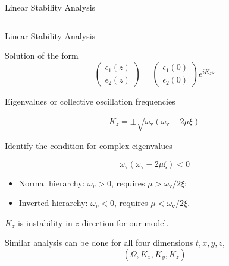 \documentclass[9pt]{beamer}
\begin{document}
\begin{darkframes}
\begin{frame}{Linear Stability Analysis}
\begin{columns}[T]
\begin{column}{0.45\textwidth}
\end{column}


\end{columns}



\end{frame}


\begin{frame}{Linear Stability Analysis}


Solution of the form
\begin{equation*}
   \begin{pmatrix}
      \epsilon_1(z)\\
      \epsilon_2(z)
   \end{pmatrix} = \begin{pmatrix}
      \epsilon_1(0)\\
      \epsilon_2(0)
   \end{pmatrix} e^{i K_z z}
\end{equation*}


Eigenvalues or collective oscillation frequencies

\begin{equation*}
   K_z = \pm \sqrt{ \omega_{\mathrm v} ( \omega_{\mathrm v}- 2\mu \xi ) }
\end{equation*}

Identify the condition for complex eigenvalues

\begin{equation*}
   \omega_{\mathrm v} ( \omega_{\mathrm v}- 2\mu \xi ) < 0
\end{equation*}

\pause

\begin{itemize}
   \item Normal hierarchy: $\omega_v>0$, requires $\mu  > \omega_{\mathrm v}/2 \xi$;
   \item Inverted hierarchy: $\omega_v<0$, requires $\mu  < \omega_{\mathrm v}/2 \xi$.
\end{itemize}

\pause

\begin{tcolorbox}
    \center
    $K_z$ is instability in $z$ direction for our model.
\end{tcolorbox}

\pause

\begin{tcolorbox}
    \centering
    Similar analysis can be done for all four dimensions $t, x, y, z$,
    \begin{equation*}
        \left( \Omega, K_x, K_y, K_z \right)
    \end{equation*}


\end{tcolorbox}
\end{frame}
\end{darkframes}
\end{document}
